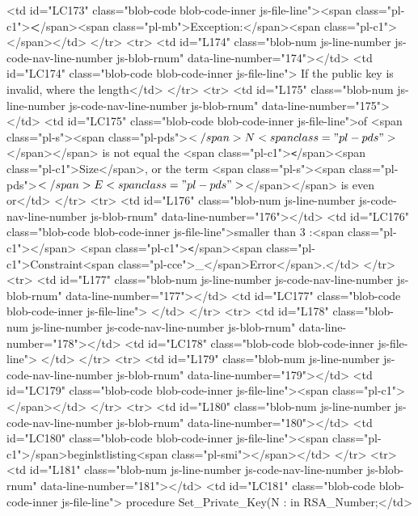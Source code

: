           <td id="LC173" class="blob-code blob-code-inner js-file-line"><span class="pl-c1">\textbf</span>{<span class="pl-mb">Exception:</span>}<span class="pl-c1">\\</span></td>
        </tr>
        <tr>
          <td id="L174" class="blob-num js-line-number js-code-nav-line-number js-blob-rnum" data-line-number="174"></td>
          <td id="LC174" class="blob-code blob-code-inner js-file-line"> If the public key is invalid, where the length</td>
        </tr>
        <tr>
          <td id="L175" class="blob-num js-line-number js-code-nav-line-number js-blob-rnum" data-line-number="175"></td>
          <td id="LC175" class="blob-code blob-code-inner js-file-line">of <span class="pl-s"><span class="pl-pds">$</span>N<span class="pl-pds">$</span></span> is not equal the <span class="pl-c1">\texttt</span>{<span class="pl-c1">Size</span>}, or the term <span class="pl-s"><span class="pl-pds">$</span>E<span class="pl-pds">$</span></span> is even or</td>
        </tr>
        <tr>
          <td id="L176" class="blob-num js-line-number js-code-nav-line-number js-blob-rnum" data-line-number="176"></td>
          <td id="LC176" class="blob-code blob-code-inner js-file-line">smaller than 3 :<span class="pl-c1">\quad</span> <span class="pl-c1">\texttt</span>{<span class="pl-c1">Constraint<span class="pl-cce">\_</span>Error</span>}.</td>
        </tr>
        <tr>
          <td id="L177" class="blob-num js-line-number js-code-nav-line-number js-blob-rnum" data-line-number="177"></td>
          <td id="LC177" class="blob-code blob-code-inner js-file-line">
</td>
        </tr>
        <tr>
          <td id="L178" class="blob-num js-line-number js-code-nav-line-number js-blob-rnum" data-line-number="178"></td>
          <td id="LC178" class="blob-code blob-code-inner js-file-line">
</td>
        </tr>
        <tr>
          <td id="L179" class="blob-num js-line-number js-code-nav-line-number js-blob-rnum" data-line-number="179"></td>
          <td id="LC179" class="blob-code blob-code-inner js-file-line"><span class="pl-c1">\hhline</span></td>
        </tr>
        <tr>
          <td id="L180" class="blob-num js-line-number js-code-nav-line-number js-blob-rnum" data-line-number="180"></td>
          <td id="LC180" class="blob-code blob-code-inner js-file-line"><span class="pl-c1">\</span>begin{lstlisting<span class="pl-smi">}</span>{}</td>
        </tr>
        <tr>
          <td id="L181" class="blob-num js-line-number js-code-nav-line-number js-blob-rnum" data-line-number="181"></td>
          <td id="LC181" class="blob-code blob-code-inner js-file-line">  procedure Set_Private_Key(N           : in RSA_Number;</td>
